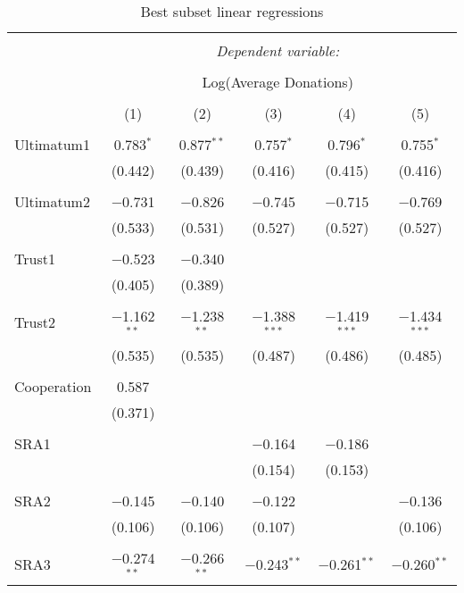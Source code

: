 \begin{table}[H] \centering 
  \caption{Best subset linear regressions} 
  \label{} 
     \begin{adjustbox}{width=\textwidth, totalheight=\baselineskip}
\begin{tabular}{@{\extracolsep{5pt}}lccccc} 
\\[-1.8ex]\hline 
\hline \\[-1.8ex] 
 & \multicolumn{5}{c}{\textit{Dependent variable:}} \\ 
\cline{2-6} 
\\[-1.8ex] & \multicolumn{5}{c}{Log(Average Donations)} \\ 
\\[-1.8ex] & (1) & (2) & (3) & (4) & (5)\\ 
\hline \\[-1.8ex] 
 Ultimatum1 & 0.783$^{*}$ & 0.877$^{**}$ & 0.757$^{*}$ & 0.796$^{*}$ & 0.755$^{*}$ \\ 
  & (0.442) & (0.439) & (0.416) & (0.415) & (0.416) \\ 
  & & & & & \\ 
 Ultimatum2 & $-$0.731 & $-$0.826 & $-$0.745 & $-$0.715 & $-$0.769 \\ 
  & (0.533) & (0.531) & (0.527) & (0.527) & (0.527) \\ 
  & & & & & \\ 
 Trust1 & $-$0.523 & $-$0.340 &  &  &  \\ 
  & (0.405) & (0.389) &  &  &  \\ 
  & & & & & \\ 
 Trust2 & $-$1.162$^{**}$ & $-$1.238$^{**}$ & $-$1.388$^{***}$ & $-$1.419$^{***}$ & $-$1.434$^{***}$ \\ 
  & (0.535) & (0.535) & (0.487) & (0.486) & (0.485) \\ 
  & & & & & \\ 
 Cooperation & 0.587 &  &  &  &  \\ 
  & (0.371) &  &  &  &  \\ 
  & & & & & \\ 
 SRA1 &  &  & $-$0.164 & $-$0.186 &  \\ 
  &  &  & (0.154) & (0.153) &  \\ 
  & & & & & \\ 
 SRA2 & $-$0.145 & $-$0.140 & $-$0.122 &  & $-$0.136 \\ 
  & (0.106) & (0.106) & (0.107) &  & (0.106) \\ 
  & & & & & \\ 
 SRA3 & $-$0.274$^{**}$ & $-$0.266$^{**}$ & $-$0.243$^{**}$ & $-$0.261$^{**}$ & $-$0.260$^{**}$ \\ 

\end{tabular}
\end{adjustbox}
\end{table}

